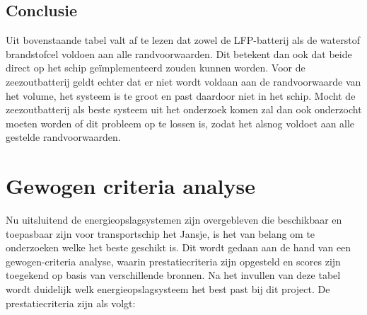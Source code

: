 \begin{table}[h]
\centering
\caption{Tabel van energieopslagmethoden specifiek voor Jansje}
\label{tab:randvoorwaarden_check}
\end{table}

\subsection*{Conclusie}
\noindent Uit bovenstaande tabel valt af te lezen dat zowel de LFP-batterij als de waterstof brandstofcel voldoen aan alle randvoorwaarden. Dit betekent dan ook dat beide direct op het schip geïmplementeerd zouden kunnen worden. Voor de zeezoutbatterij geldt echter dat er niet wordt voldaan aan de randvoorwaarde van het volume, het systeem is te groot en past daardoor niet in het schip. Mocht de zeezoutbatterij als beste systeem uit het onderzoek komen zal dan ook onderzocht moeten worden of dit probleem op te lossen is, zodat het alsnog voldoet aan alle gestelde randvoorwaarden.

\section{Gewogen criteria analyse}


\noindent Nu uitsluitend de energieopslagsystemen zijn overgebleven die beschikbaar en toepasbaar zijn voor transportschip het Jansje, is het van belang om te onderzoeken welke het beste geschikt is. Dit wordt gedaan aan de hand van een gewogen-criteria analyse, waarin prestatiecriteria zijn opgesteld en scores zijn toegekend op basis van verschillende bronnen. Na het invullen van deze tabel wordt duidelijk welk energieopslagsysteem het best past bij dit project. De prestatiecriteria zijn als volgt:

